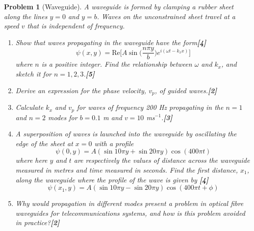 \documentclass[a4paper]{article}
\theoremstyle{new}
\newtheorem{qns}{Problem}[subsection]
\begin{document}
\begin{qns}[Waveguide]
A waveguide is formed by clamping a rubber sheet along the lines $y = 0$ and $y = b$. Waves on the unconstrained sheet travel at a speed $v$ that is independent of frequency.
\begin{enumerate}[label=(\roman*)]
\item Show that waves propagating in the waveguide have the form\hfill\textbf{[4]}
$$\psi(x,y)=\text{Re}\bigg[A\sin\bigg(\frac{n\pi y}{b}\bigg)e^{i(\omega t-k_xx)}\bigg]$$
where $n$ is a positive integer. Find the relationship between $\omega$ and $k_x$, and sketch it for $n=1,2,3$.\hfill\textbf{[5]}
\item Derive an expression for the phase velocity, $v_p$, of guided waves.\hfill\textbf{[2]}
\item Calculate $k_x$ and $v_p$ for waves of frequency 200 Hz propagating in the $n = 1$ and $n = 2$ modes for $b = 0.1$ m and $v = 10$ ms$^{-1}$.\hfill\textbf{[3]}
\item A superposition of waves is launched into the waveguide by oscillating the edge of the sheet at $x = 0$ with a profile
$$\psi(0,y)=A(\sin10\pi y+\sin20\pi y)\cos(400\pi t)$$
where here $y$ and $t$ are respectively the values of distance across the waveguide measured in metres and time measured in seconds. Find the first distance, $x_1$, along the waveguide where the profile of the wave is given by \hfill\textbf{[4]}
$$\psi(x_1,y)=A(\sin10\pi y-\sin20\pi y)\cos(400\pi t+\phi)$$
\item Why would propagation in different modes present a problem in optical fibre waveguides for telecommunications systems, and how is this problem avoided in practice?\hfill\textbf{[2]}
\end{enumerate}
\end{qns}
\end{document}
